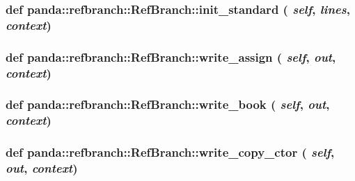 \label{classpanda_1_1refbranch_1_1RefBranch_aeae9c75c06bf44c67bf6ae429edc2f14}
\hypertarget{classpanda_1_1refbranch_1_1RefBranch_a7438765b8f85b85839103a0957f8aa22}{
\subsubsection[{init\_\-standard}]{\setlength{\rightskip}{0pt plus 5cm}def panda::refbranch::RefBranch::init\_\-standard ( {\em self}, \/   {\em lines}, \/   {\em context})}}
\label{classpanda_1_1refbranch_1_1RefBranch_a7438765b8f85b85839103a0957f8aa22}
\hypertarget{classpanda_1_1refbranch_1_1RefBranch_ac0f58796982b3939022a293a576d3ae2}{
\subsubsection[{write\_\-assign}]{\setlength{\rightskip}{0pt plus 5cm}def panda::refbranch::RefBranch::write\_\-assign ( {\em self}, \/   {\em out}, \/   {\em context})}}
\label{classpanda_1_1refbranch_1_1RefBranch_ac0f58796982b3939022a293a576d3ae2}
\hypertarget{classpanda_1_1refbranch_1_1RefBranch_ab1b81c338c912c13dd94bb6568501ced}{
\subsubsection[{write\_\-book}]{\setlength{\rightskip}{0pt plus 5cm}def panda::refbranch::RefBranch::write\_\-book ( {\em self}, \/   {\em out}, \/   {\em context})}}
\label{classpanda_1_1refbranch_1_1RefBranch_ab1b81c338c912c13dd94bb6568501ced}
\hypertarget{classpanda_1_1refbranch_1_1RefBranch_a4ad1688aa5e4f87146a3db6bd6999c3b}{
\subsubsection[{write\_\-copy\_\-ctor}]{\setlength{\rightskip}{0pt plus 5cm}def panda::refbranch::RefBranch::write\_\-copy\_\-ctor ( {\em self}, \/   {\em out}, \/   {\em context})}}
